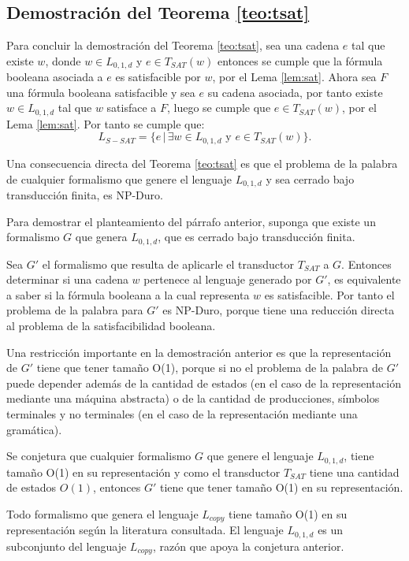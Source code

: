 \subsection{Demostración del Teorema \ref{teo:tsat}}

Para concluir la demostración del Teorema \ref{teo:tsat}, sea una cadena $e$ tal que existe $w$, donde $w \in L_{0,1,d}$ y $e \in T_{SAT}(w)$ entonces 
se cumple que la fórmula booleana asociada a $e$ es satisfacible por $w$, por el Lema \ref{lem:sat}. Ahora sea $F$ una fórmula 
booleana satisfacible y sea $e$ su cadena asociada, por tanto existe $w\in L_{0,1,d}$ tal que $w$ satisface a $F$, luego se cumple que $e\in T_{SAT}(w)$, por el Lema \ref{lem:sat}. Por tanto se cumple que:
$$L_{S-SAT} = \{e\,|\,\exists w \in L_{0,1,d} \text{ y } e \in T_{SAT}(w) \}.$$

Una consecuencia directa del Teorema \ref{teo:tsat} es que el problema de la palabra de cualquier formalismo que genere el lenguaje $L_{0,1,d}$ y sea cerrado bajo transducción finita, es NP-Duro.

Para demostrar el planteamiento del párrafo anterior, suponga que existe un formalismo $G$ que genera $L_{0,1,d}$, 
que es cerrado bajo transducción finita. 

Sea $G'$ el formalismo que resulta de aplicarle el transductor $T_{SAT}$ a $G$. Entonces determinar si una cadena 
$w$ pertenece al lenguaje generado por $G'$, es equivalente a saber si la fórmula booleana a la cual representa 
$w$ es satisfacible. Por tanto el problema de la palabra para 
$G'$ es NP-Duro, porque tiene una reducción directa al problema de la satisfacibilidad booleana. 

Una restricción importante en la demostración anterior es que la representación de $G'$ tiene que tener tamaño O(1),
porque si no el problema de la palabra de $G'$ puede depender además de la cantidad de estados (en el caso de
la representación mediante una máquina abstracta) o de la cantidad de producciones, símbolos terminales y no terminales
(en el caso de la representación mediante una  gramática).

Se conjetura que cualquier formalismo $G$ que genere el lenguaje $L_{0,1,d}$, tiene tamaño O(1) en su representación
y como el transductor $T_{SAT}$ tiene una cantidad de estados $O(1)$, entonces $G'$ tiene que tener tamaño O(1) en su representación.

Todo formalismo que genera el lenguaje $L_{copy}$ tiene tamaño O(1) en su representación según la literatura consultada.
El lenguaje $L_{0,1,d}$ es un subconjunto del lenguaje $L_{copy}$, razón que apoya la conjetura anterior.

